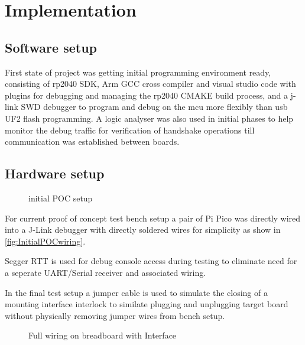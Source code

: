 \clearpage%
\vspace{21.5pt}
\chapter{Implementation}
\section{Software  setup}

First state of project was getting initial programming environment ready, consisting of rp2040 SDK, Arm GCC cross compiler and visual studio code with plugins for debugging and managing the rp2040 CMAKE build process, and a j-link SWD debugger to program and debug on the \gls{mcu} more flexibly than \gls{usb} UF2 flash programming. A logic analyser was also used in initial phases to help monitor the debug traffic for verification of handshake operations till communication was established between boards.

\section{Hardware setup}
%
\begin{figure}[ht]
	\centering
	\caption{initial POC setup}
	\label{fig:InitialPOCwiring}
\end{figure}

For current proof of concept test bench setup a pair of Pi Pico was directly wired into a J-Link debugger with directly soldered wires for simplicity as show in \autoref{fig:InitialPOCwiring}.

Segger RTT is used for debug console access during testing to eliminate need for a seperate UART/Serial receiver and associated wiring.

In the final test setup a jumper cable is used to simulate the closing of a mounting interface interlock to similate plugging and unplugging target board without physically removing jumper wires from bench setup.

\begin{figure}[ht]
	\centering
	\caption{Full wiring on breadboard with Interface}
	\label{fig:FullPOCwiring}
\end{figure}

